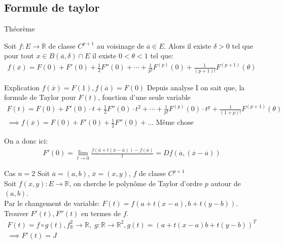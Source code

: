 \subsection{Formule de taylor}
\begin{parag}{Théorème}
    \begin{theoreme}
        Soit $f: E \to \mathbb{R}$ de classe $C^{p+1}$ au voisinage de $ \overline{a} \in E$. Alors il existe $ \delta > 0$ tel que pour tout $x \in B( \overline{a}, \delta) \cap E$ il existe $0 < \theta < 1$ tel que:
        \begin{align*}
            f( \overline{x}) = F(0) + F'(0) + \frac{1}{2} F''(0) + \cdots  + \frac{1}{p!}F^{(p)}(0) + \frac{1}{(p+1)!}F^{(p+1)}(\theta)
        \end{align*}
    \end{theoreme}
   \begin{subparag}{Explication}
       $f( \overline{x}) = F(1), f( \overline{a}) = F(0)$
      Depuis analyse I on sait que, la formule de Taylor pour $F(t)$, fonction d'une seule variable
      \begin{align*}
          F(t) = F(0) + F'(0) \cdot t + \frac{1}{2}F''(0) \cdot t^2 + \cdots  + \frac{1}{p!} F^{(p)}(0) \cdot t^p + \frac{1}{(1+p)!}F^{(p+1)}( \theta)\\
          \implies f( \overline{x}) = F(0) + F'(0) + \frac{1}{2}F''(0) + ...    \text{ Même chose}
      \end{align*}
      \begin{framedremark}
          On a donc ici:
          \begin{align*}
              F'(0) = \lim_{t \to 0} \frac{f( \overline{a} + t( \overline{x} - \overline{a})) - f( \overline{a})}{t} = Df( \overline{a}, ( \overline{x} - \overline{a}))
          \end{align*}
          
      \end{framedremark}
      
      
   \end{subparag} 

\end{parag}


\begin{parag}{Cas $n = 2$}
    Soit $ \overline{a} = (a, b)$, $ \overline{x} = (x, y)$, $f$ de classe $C^{p+1}$\\
    Soit $f(x, y) : E \to \mathbb{R}$, on cherche le polynôme de Taylor d'ordre $p$ autour de $(a, b)$.\\
    Par le changement de variable: $F(t) = f(a + t(x-a), b+t(y-b))$. Trouver $F'(t), F''(t)$ en termes de $f$.
    \begin{align*}
        F(t) = f \circ g(t), f_ \mathbb{R}^2 \to \mathbb{R}, \; g: \mathbb{R} \to \mathbb{R}^2, g(t) = (a + t(x - a) b+ t(y -b))^T \\
        \implies F'(t) = J
    \end{align*}
    


\end{parag}

